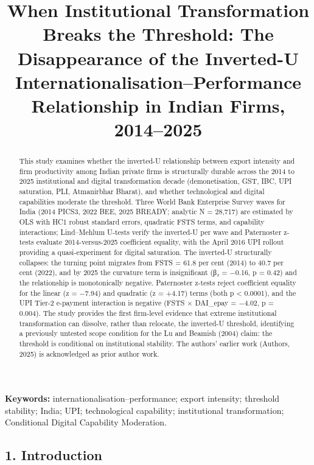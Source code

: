 \documentclass[
  12pt,a4paper]{article}
\title{When Institutional Transformation Breaks the Threshold: The
Disappearance of the Inverted-U Internationalisation--Performance
Relationship in Indian Firms, 2014--2025}
\author{}
\date{}
\begin{document}
\maketitle
\begin{abstract}
This study examines whether the inverted-U relationship between export
intensity and firm productivity among Indian private firms is
structurally durable across the 2014 to 2025 institutional and digital
transformation decade (demonetisation, GST, IBC, UPI saturation, PLI,
Atmanirbhar Bharat), and whether technological and digital capabilities
moderate the threshold. Three World Bank Enterprise Survey waves for
India (2014 PICS3, 2022 BEE, 2025 BREADY; analytic N = 28,717) are
estimated by OLS with HC1 robust standard errors, quadratic FSTS terms,
and capability interactions; Lind--Mehlum U-tests verify the inverted-U
per wave and Paternoster z-tests evaluate 2014-versus-2025 coefficient
equality, with the April 2016 UPI rollout providing a quasi-experiment
for digital saturation. The inverted-U structurally collapses: the
turning point migrates from FSTS = 61.8 per cent (2014) to 40.7 per cent
(2022), and by 2025 the curvature term is insignificant (β₂ = −0.16, p =
0.42) and the relationship is monotonically negative. Paternoster
z-tests reject coefficient equality for the linear (z = −7.94) and
quadratic (z = +4.17) terms (both p \textless{} 0.0001), and the UPI
Tier-2 e-payment interaction is negative (FSTS × DAI\_epay = −4.02, p =
0.004). The study provides the first firm-level evidence that extreme
institutional transformation can dissolve, rather than relocate, the
inverted-U threshold, identifying a previously untested scope condition
for the Lu and Beamish (2004) claim: the threshold is conditional on
institutional stability. The authors' earlier work (Authors, 2025) is
acknowledged as prior author work.
\end{abstract}

\textbf{Keywords:} internationalisation--performance; export intensity;
threshold stability; India; UPI; technological capability; institutional
transformation; Conditional Digital Capability Moderation.

\hypertarget{introduction}{%
\subsection{1. Introduction}\label{introduction}}
\end{document}
